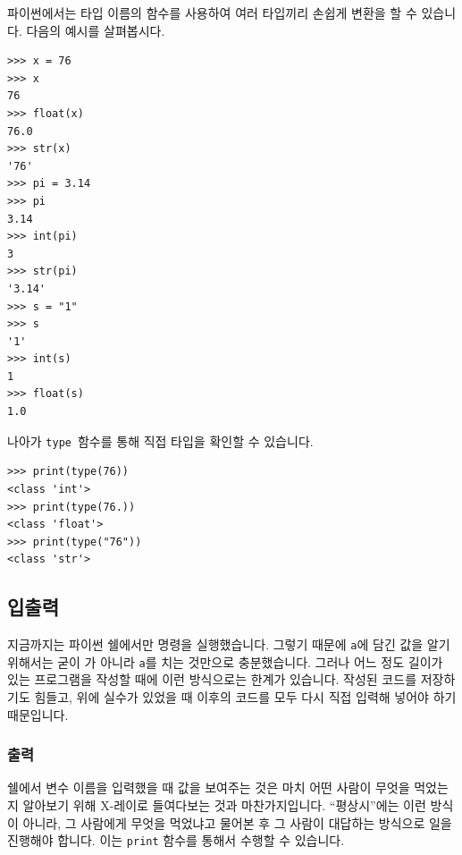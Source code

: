 \documentclass[../main.tex]{subfiles}
\begin{document}
파이썬에서는 타입 이름의 함수를 사용하여 여러 타입끼리 손쉽게 변환을 할 수 있습니다.
다음의 예시를 살펴봅시다.
\begin{verbatim}
>>> x = 76
>>> x
76
>>> float(x)
76.0
>>> str(x)
'76'
>>> pi = 3.14
>>> pi
3.14
>>> int(pi)
3
>>> str(pi)
'3.14'
>>> s = "1"
>>> s
'1'
>>> int(s)
1
>>> float(s)
1.0
\end{verbatim}
나아가 \texttt{type}~함수를 통해 직접 타입을 확인할 수 있습니다.
\begin{verbatim}
>>> print(type(76))
<class 'int'>
>>> print(type(76.))
<class 'float'>
>>> print(type("76"))
<class 'str'>
\end{verbatim}

\subsection{입출력}
지금까지는 파이썬 쉘에서만 명령을 실행했습니다.
그렇기 때문에 \verb/a/에 담긴 값을 알기 위해서는 굳이 가 아니라 \verb/a/를 치는 것만으로 충분했습니다.
그러나 어느 정도 길이가 있는 프로그램을 작성할 때에 이런 방식으로는 한계가 있습니다.
작성된 코드를 저장하기도 힘들고, 위에 실수가 있었을 때 이후의 코드를 모두 다시 직접 입력해 넣어야 하기 때문입니다.

\subsubsection{출력}
쉘에서 변수 이름을 입력했을 때 값을 보여주는 것은 마치 어떤 사람이 무엇을 먹었는지 알아보기 위해 X-레이로 들여다보는 것과 마찬가지입니다.
``평상시''에는 이런 방식이 아니라, 그 사람에게 무엇을 먹었냐고 물어본 후 그 사람이 대답하는 방식으로 일을 진행해야 합니다.
이는 \verb/print/ 함수를 통해서 수행할 수 있습니다.
\end{document}
